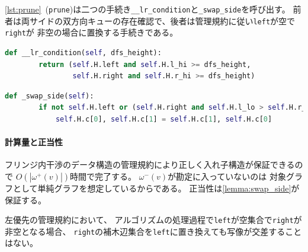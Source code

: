 \lstrefname\ref{lst:prune}~({\tt prune})は二つの手続き{\tt \_\_lr\_condition}と{\tt \_swap\_side}を呼び出す。
前者は両サイドの双方向キューの存在確認で、後者は管理規約に従い{\tt left}が空で{\tt right}が
非空の場合に置換する手続きである。

\begin{lstlisting}[language=Python, caption=\_\_lr\_condition,
                   label=lst:lr_condition]
    def __lr_condition(self, dfs_height):
        return (self.H.left and self.H.l_hi >= dfs_height,
                self.H.right and self.H.r_hi >= dfs_height)            
\end{lstlisting}


\begin{lstlisting}[language=Python, caption=\_swap\_side,
                   label=lst:swap_side]
    def _swap_side(self):
        if not self.H.left or (self.H.right and self.H.l_lo > self.H.r_lo):
            self.H.c[0], self.H.c[1] = self.H.c[1], self.H.c[0]
\end{lstlisting}



\paragraph{計算量と正当性}
フリンジ内干渉のデータ構造の管理規約により正しく入れ子構造が保証できるので
$O(|\omega^+(v)|)$時間で完了する。
$\omega^-(v)$が勘定に入っていないのは
対象グラフとして単純グラフを想定しているからである。
正当性は\cref{lemma:swap_side}が保証する。

\begin{lemma}
\label{lemma:swap_side}
左優先の管理規約において、
アルゴリズムの処理過程で{\tt left}が空集合で{\tt right}が非空となる場合、
{\tt right}の補木辺集合を{\tt left}に置き換えても写像が交差することはない。
\end{lemma}

